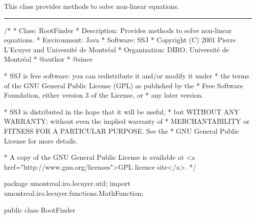 
This class provides methods to solve non-linear equations.

\bigskip\hrule

\begin{code}
\begin{hide}
/*
 * Class:        RootFinder
 * Description:  Provides methods to solve non-linear equations.
 * Environment:  Java
 * Software:     SSJ 
 * Copyright (C) 2001  Pierre L'Ecuyer and Université de Montréal
 * Organization: DIRO, Université de Montréal
 * @author       
 * @since

 * SSJ is free software: you can redistribute it and/or modify it under
 * the terms of the GNU General Public License (GPL) as published by the
 * Free Software Foundation, either version 3 of the License, or
 * any later version.

 * SSJ is distributed in the hope that it will be useful,
 * but WITHOUT ANY WARRANTY; without even the implied warranty of
 * MERCHANTABILITY or FITNESS FOR A PARTICULAR PURPOSE.  See the
 * GNU General Public License for more details.

 * A copy of the GNU General Public License is available at
   <a href="http://www.gnu.org/licenses">GPL licence site</a>.
 */
\end{hide}
package umontreal.iro.lecuyer.util;
   import umontreal.iro.lecuyer.functions.MathFunction;


public class RootFinder\begin{hide} {
   private RootFinder() {}\end{hide}
\end{code}

